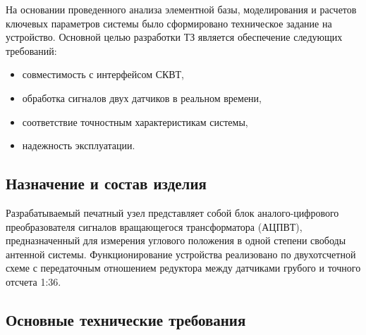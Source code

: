 На основании проведенного анализа элементной базы, моделирования и расчетов ключевых параметров системы было сформировано техническое задание на устройство. 
Основной целью разработки ТЗ является обеспечение следующих требований:
\begin{itemize}
    \item совместимость с интерфейсом СКВТ, 
    \item обработка сигналов двух датчиков в реальном времени,
    \item соответствие точностным характеристикам системы,
    \item надежность эксплуатации.
\end{itemize}

\subsection{Назначение и состав изделия}
Разрабатываемый печатный узел представляет собой блок аналого-цифрового преобразователя сигналов вращающегося трансформатора (АЦПВТ), 
предназначенный для измерения углового положения в одной степени свободы антенной системы. Функционирование устройства реализовано по двухотсчетной 
схеме с передаточным отношением редуктора между датчиками грубого и точного отсчета 1:36.

\subsection{Основные технические требования}

